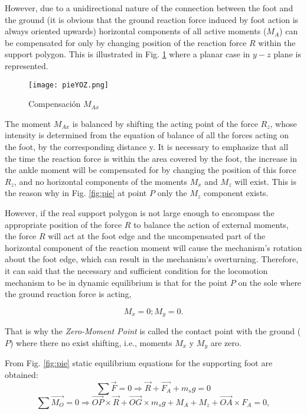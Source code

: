 However, due to a unidirectional nature of the connection between the foot and the ground (it is obvious that the ground reaction force induced by foot action is always oriented upwards) horizontal components of all active moments ($M_A$) can be compensated for only by changing position of the reaction force $R$ within the support polygon. This is illustrated in Fig. \ref{fig:pieYOZ} where a planar case in $y-z$ plane is represented.

\begin{figure}[!hbt]
\centering
\texttt{[image: pieYOZ.png]}
\caption{Compensación $M_{Ax}$ \protect\cite{Vuk2004} }
\label{fig:pieYOZ}
\end{figure} 

The moment $M_{Ax}$ is balanced by shifting the acting point of the force $R_z$, whose intensity is determined from the equation of balance of all the forces acting on the foot, by the corresponding distance y. It is necessary to emphasize that all the time the reaction force is within the area covered by the foot, the increase in the ankle moment will be compensated for by changing the position of this force $R_z$, and no horizontal components of the moments $M_x$ and $M_z$ will exist. This is the reason why in Fig. \ref{fig:pie} at point $P$ only the $M_z$ component exists.

However, if the real support polygon is not large enough to encompass the appropriate position of the force $R$ to balance the action of external moments, the force $R$ will act at the foot edge and the uncompensated part of the horizontal component of the reaction moment will cause the mechanism’s rotation about the foot edge, which can result in the mechanism’s overturning. Therefore, it can said that the necessary and sufficient condition for the locomotion mechanism to be in dynamic equilibrium is that for the point $P$ on the sole where the ground reaction force is acting,

\begin{equation}
M_x = 0;
M_y = 0.
\end{equation}

That is why the \textit{Zero-Moment Point} is called the contact point with the ground ($P$) where there no exist shifting, i.e., moments $M_x$ y $M_y$ are zero.

From Fig. \ref{fig:pie} static equilibrium equations for the supporting foot are obtained:
\begin{equation}
\sum \overrightarrow{F} = 0 \Rightarrow \overrightarrow{R} + \overrightarrow{F_A} + m_s g = 0
\label{eq:fuerzas}
\end{equation}
\begin{equation}
\sum \overrightarrow{M_O} = 0 \Rightarrow \overrightarrow{OP} \times \overrightarrow{R} + \overrightarrow{OG} \times m_sg + M_A + M_z + \overrightarrow{OA} \times F_A = 0,
\label{eq:momentos}
\end{equation}

